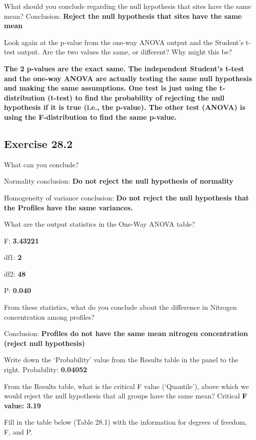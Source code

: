 \documentclass[
]{scrbook}
\begin{document}
What should you conclude regarding the null hypothesis that sites have the same mean?
Conclusion: \textbf{Reject the null hypothesis that sites have the same mean}

Look again at the p-value from the one-way ANOVA output and the Student's t-test output. Are the two values the same, or different? Why might this be?

\textbf{The 2 p-values are the exact same. The independent Student's t-test and the one-way ANOVA are actually testing the same null hypothesis and making the same assumptions. One test is just using the t-distribution (t-test) to find the probability of rejecting the null hypothesis if it is true (i.e., the p-value). The other test (ANOVA) is using the F-distribution to find the same p-value.}

\hypertarget{exercise-28.2}{%
\subsection{Exercise 28.2}\label{exercise-28.2}}

What can you conclude?

Normality conclusion: \textbf{Do not reject the null hypothesis of normality}

Homogeneity of variance conclusion: \textbf{Do not reject the null hypothesis that the Profiles have the same variances.}

What are the output statistics in the One-Way ANOVA table?

F: \textbf{3.43221}

df1: \textbf{2}

df2: \textbf{48}

P: \textbf{0.040}

From these statistics, what do you conclude about the difference in Nitrogen concentration among profiles?

Conclusion: \textbf{Profiles do not have the same mean nitrogen concentration (reject null hypothesis)}

Write down the `Probability' value from the Results table in the panel to the right.
Probability: \textbf{0.04052}

From the Results table, what is the critical F value (`Quantile'), above which we would reject the null hypothesis that all groups have the same mean? Critical \textbf{F value: 3.19}

Fill in the table below (Table 28.1) with the information for degrees of freedom, F, and P.
\end{document}
